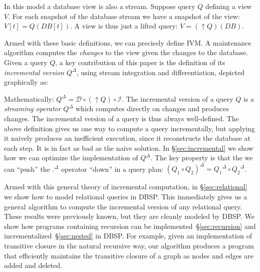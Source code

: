 \documentclass[twocolumn
]{svjour3}
\numberwithin{equation}{section}
\newcommand{\dbsp}{DBSP\xspace}
\newcommand{\I}{\mathcal{I}}  %
\newcommand{\D}{\mathcal{D}}  %
\newcommand{\I}{\mathit{I}}  %
\newcommand{\D}{\mathit{D}}  %
\newcommand{\inc}[1]{{#1}^{\Delta}}
\newcommand{\secref}[1]{\S\ref{#1}}  %
\newcommand{\refsec}[1]{\secref{#1}}
\newcommand{\lift}[1]{{\uparrow}#1}
\begin{document}
In this model a database view is also a stream.  Suppose query $Q$
defining a view $V$.  For each snapshot of the database stream we have
a snapshot of the view: $V[t] = Q(DB[t])$.  A view is thus just a
lifted query: $V = (\lift{Q})(DB)$.

Armed with these basic definitions, we can precisely define IVM.  A
maintenance algorithm computes the \emph{changes} to the view given
the changes to the database. Given a query $Q$, a key contribution of
this paper is the definition of its \emph{incremental version}
$\inc{Q}$, using stream integration and differentiation, depicted
graphically as:

%
\begin{center}
\end{center}

%
Mathematically: $\inc{Q} = \D \circ (\lift{Q}) \circ \I$.  The
incremental version of a query $Q$ is a \emph{streaming operator}
$\inc{Q}$ which computes directly on changes and produces changes.
The incremental version of a query is thus always well-defined.  The
above definition gives us one way to compute a query incrementally,
but applying it naively produces an inefficient execution, since it
reconstructs the database at each step.  It is in fact as bad as the
naive solution.  In \refsec{sec:incremental} we show how we can
optimize the implementation of $\inc{Q}$. The key property is that the
we can ``push'' the $\inc{.}$ operator ``down'' in a query plan:
$\inc{(Q_1 \circ Q_2)} = \inc{Q_1} \circ \inc{Q_2}$.

Armed with this general theory of incremental computation, in
\secref{sec:relational} we show how to model relational queries in
\dbsp.  This immediately gives us a general algorithm to compute the
incremental version of any relational query.  These results were
previously known, but they are cleanly modeled by \dbsp.  We show how
programs containing recursion can be
implemented~\secref{sec:recursion} and
incrementalized~\secref{sec:nested} in \dbsp.  For example, given an
implementation of transitive closure in the natural recursive way, our
algorithm produces a program that efficiently maintains the transitive
closure of a graph as nodes and edges are added and deleted.
\end{document}
